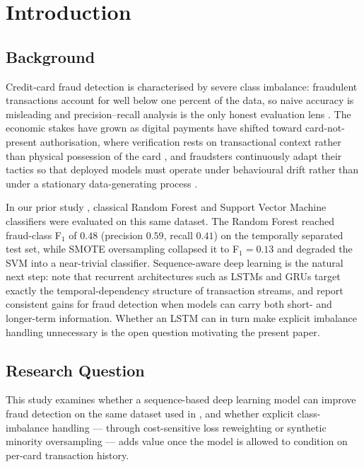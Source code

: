 \documentclass[oneside,12pt,parskip=half,american,numbers=noenddot]{scrreprt}
\renewcommand*{\chapterpagestyle}{frontmatter} %
\begin{document}
\setcounter{page}{1}

\pagestyle{mainmatter}
\renewcommand*{\chapterpagestyle}{mainmatter}

\onehalfspacing

\chapter{Introduction}\label{ch:intro}

\section{Background}\label{sec:background}
Credit-card fraud detection is characterised by severe class imbalance: fraudulent transactions account for well below one percent of the data, so naive accuracy is misleading and precision--recall analysis is the only honest evaluation lens \parencite{gunjan_credit_2022}. The economic stakes have grown as digital payments have shifted toward card-not-present authorisation, where verification rests on transactional context rather than physical possession of the card \parencite{xuan_random_2018}, and fraudsters continuously adapt their tactics so that deployed models must operate under behavioural drift rather than under a stationary data-generating process \parencite{afriyie_supervised_2023}.

In our prior study \parencite{Du2026MLFraud}, classical Random Forest and Support Vector Machine classifiers were evaluated on this same dataset. The Random Forest reached fraud-class F\(_1\) of $0.48$ (precision $0.59$, recall $0.41$) on the temporally separated test set, while SMOTE oversampling collapsed it to F\(_1 = 0.13\) and degraded the SVM into a near-trivial classifier. Sequence-aware deep learning is the natural next step: \textcite{mienye_deep_2024} note that recurrent architectures such as LSTMs and GRUs target exactly the temporal-dependency structure of transaction streams, and \textcite{zhou_deep_2025} report consistent gains for fraud detection when models can carry both short- and longer-term information. Whether an LSTM can in turn make explicit imbalance handling unnecessary is the open question motivating the present paper.

\section{Research Question}\label{sec:research_question}
This study examines whether a sequence-based deep learning model can improve fraud detection on the same dataset used in \textcite{Du2026MLFraud}, and whether explicit class-imbalance handling — through cost-sensitive loss reweighting or synthetic minority oversampling — adds value once the model is allowed to condition on per-card transaction history.
\end{document}
